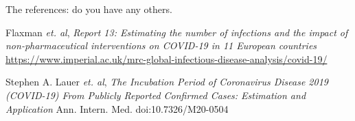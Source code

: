 \documentclass{mm2}
\begin{document}
The references: do you have any others.

\begin{thebibliography}{99}
Flaxman {\it et. al},
{\it Report 13: ­­Estimating the number of infections and the impact of non-pharmaceutical interventions on COVID-19 in 11 European countries}
\href{https://www.imperial.ac.uk/mrc-global-infectious-disease-analysis/covid-19/}{https://www.imperial.ac.uk/mrc-global-infectious-disease-analysis/covid-19/}

  Stephen A. Lauer {\it et. al},
{\it The Incubation Period of Coronavirus Disease 2019 (COVID-19) From
Publicly Reported Confirmed Cases: Estimation and Application}
Ann. Intern. Med. doi:10.7326/M20-0504





\end{thebibliography}{}
\end{document}
